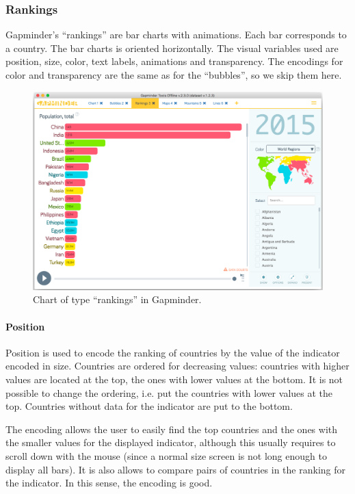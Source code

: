 \subsubsection{Rankings}
\label{subsubsec:rankings}
Gapminder's ``rankings'' are bar charts with animations.
Each bar corresponds to a country.
The bar charts is oriented horizontally.
The visual variables used are position, size, color, text labels, animations and transparency.
The encodings for color and transparency are the same as for the ``bubbles'', so we skip them here.

\begin{figure}[h]
	\centering
	\includegraphics[width=0.95\columnwidth]{figures/rankings}
	\caption{Chart of type ``rankings'' in Gapminder.}
	\label{fig:rankings}
\end{figure}

\paragraph{Position}
Position is used to encode the ranking of countries by the value of the indicator encoded in size.
Countries are ordered for decreasing values:
countries with higher values are located at the top, the ones with lower values at the bottom.
It is not possible to change the ordering, i.e. put the countries with lower values at the top.
Countries without data for the indicator are put to the bottom.

The encoding allows the user to easily find the top countries and the ones with the smaller values for the displayed indicator, although this usually requires to scroll down with the mouse (since a normal size screen is not long enough to display all bars).
It is also allows to compare pairs of countries in the ranking for the indicator.
In this sense, the encoding is good.

